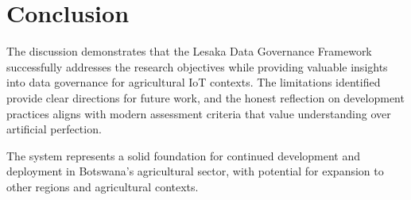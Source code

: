 \section{Conclusion}

The discussion demonstrates that the Lesaka Data Governance Framework successfully addresses the research objectives while providing valuable insights into data governance for agricultural IoT contexts. The limitations identified provide clear directions for future work, and the honest reflection on development practices aligns with modern assessment criteria that value understanding over artificial perfection.

The system represents a solid foundation for continued development and deployment in Botswana's agricultural sector, with potential for expansion to other regions and agricultural contexts.

